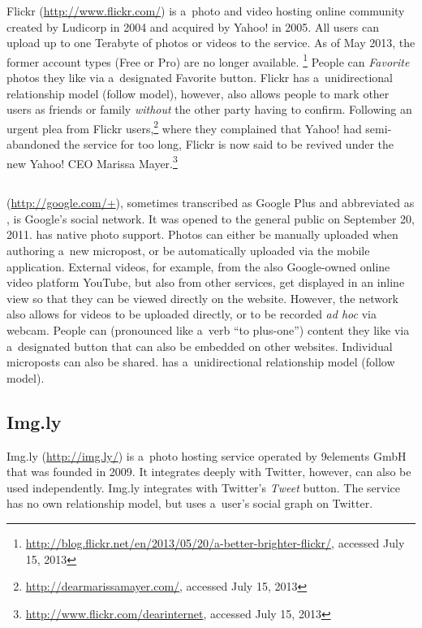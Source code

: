 Flickr (\url{http://www.flickr.com/})
is a~photo and video hosting online community
created by Ludicorp in 2004 and acquired by Yahoo! in 2005.
All users can upload up to one Terabyte of photos or videos
to the service.
As of May 2013, the former account types (Free or Pro)
are no longer available.%
\footnote{\url{http://blog.flickr.net/en/2013/05/20/a-better-brighter-flickr/},
accessed July 15, 2013}
People can \emph{Favorite} photos they like
via a~designated Favorite button.
Flickr has a~unidirectional relationship model (follow model),
however, also allows people to mark other users as friends
or family \emph{without} the other party having to confirm.
Following an urgent plea from Flickr
users,\footnote{\url{http://dearmarissamayer.com/},
accessed July 15, 2013}
where they complained that Yahoo!
had semi-abandoned the service for too long,
Flickr is now said to be revived under the new Yahoo! CEO Marissa
Mayer.\footnote{\url{http://www.flickr.com/dearinternet},
accessed July 15, 2013}

\subsection{\googleplus}

\googleplus (\url{http://google.com/+}),
sometimes transcribed as Google Plus
and abbreviated as \gplus, is Google's social network.
It was opened to the general public on September 20, 2011.
\googleplus has native photo support.
Photos can either be manually uploaded
when authoring a~new micropost,
or be automatically uploaded via the \googleplus
mobile application.
External videos, for example, from
the also Google-owned online video platform YouTube,
but also from other services,
get displayed in an inline view
so that they can be viewed directly on the website.
However, the network also allows for
videos to be uploaded directly,
or to be recorded \emph{ad hoc} via webcam.
People can \emph{\plusone}
(pronounced like a~verb ``to plus-one'') content they like
via a~designated \plusone button
that can also be embedded on other websites.
Individual microposts can also be shared.
\googleplus has a~unidirectional relationship model
(follow model).

\subsection{Img.ly}

Img.ly (\url{http://img.ly/})
is a~photo hosting service operated by 9elements GmbH
that was founded in 2009.
It integrates deeply with Twitter, however,
can also be used independently.
Img.ly integrates with Twitter's \emph{Tweet} button. 
The service has no own relationship model,
but uses a~user's social graph on Twitter.

